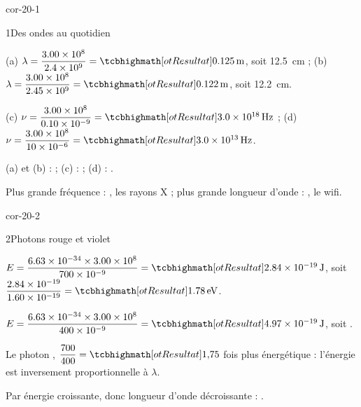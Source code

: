 \corrigesSouples

\begin{blocLivre}{cor-20-1}
\begin{corrige}{1}{Des ondes au quotidien}
\begin{questions}
\item (a) $\lambda=\dfrac{\num{3,00e8}}{\num{2,4e9}}=\res{\qty{0,125}{m}}$, soit \qty{12,5}{cm} ; (b) $\lambda=\dfrac{\num{3,00e8}}{\num{2,45e9}}=\res{\qty{0,122}{m}}$, soit \qty{12,2}{cm}.
\item (c) $\nu=\dfrac{\num{3,00e8}}{\num{0,10e-9}}=\res{\qty{3,0e18}{Hz}}$ ; (d) $\nu=\dfrac{\num{3,00e8}}{\num{10e-6}}=\res{\qty{3,0e13}{Hz}}$.
\item (a) et (b) :  ; (c) :  ; (d) : .
\item Plus grande fréquence : , les rayons X ; plus grande longueur d'onde : , le wifi.
\end{questions}
\end{corrige}
\end{blocLivre}
\begin{blocLivre}{cor-20-2}
\begin{corrige}{2}{Photons rouge et violet}
\begin{questions}
\item $E=\dfrac{\num{6,63e-34}\times\num{3,00e8}}{\num{700e-9}}=\res{\qty{2,84e-19}{J}}$, soit $\dfrac{\num{2,84e-19}}{\num{1,60e-19}}=\res{\qty{1,78}{eV}}$.
\item $E=\dfrac{\num{6,63e-34}\times\num{3,00e8}}{\num{400e-9}}=\res{\qty{4,97e-19}{J}}$, soit .
\item Le photon , $\dfrac{700}{400}=\res{1{,}75}$ fois plus énergétique : l'énergie est inversement proportionnelle à $\lambda$.
\item Par énergie croissante, donc longueur d'onde décroissante : .
\end{questions}
\end{corrige}
\end{blocLivre}
